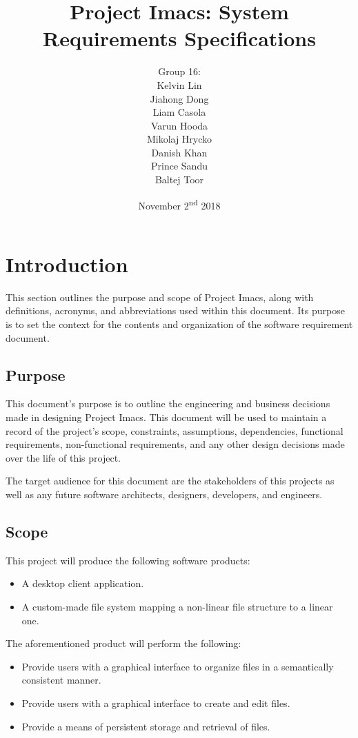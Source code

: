 \documentclass{article}
\title{Project Imacs: System Requirements Specifications}
\author{Group 16:\\ Kelvin Lin\\ Jiahong Dong\\ Liam Casola\\ Varun Hooda\\ Mikolaj Hrycko\\ Danish Khan\\ Prince Sandu\\ Baltej Toor }
\date{November 2\textsuperscript{nd} 2018}
\begin{document}
\maketitle
\newpage
\tableofcontents
\newpage
\section{Introduction}
This section outlines the purpose and scope of Project Imacs, along with definitions, acronyms, and abbreviations used within this document. Its purpose is to set the context for the contents and organization of the software requirement document.

\subsection{Purpose}
This document's purpose is to outline the engineering and business decisions made in designing Project Imacs. This document will be used to maintain a record of the project's scope, constraints, assumptions, dependencies, functional requirements, non-functional requirements, and any other design decisions made over the life of this project.

The target audience for this document are the stakeholders of this projects as well as any future software architects, designers, developers, and engineers.

\subsection{Scope}
This project will produce the following software products:

\begin{itemize}
    \item A desktop client application.
    \item A custom-made file system mapping a non-linear file structure to a linear one.
\end{itemize}

The aforementioned product will perform the following:

\begin{itemize}
    \item Provide users with a graphical interface to organize files in a semantically consistent manner.
    \item Provide users with a graphical interface to create and edit files.
    \item Provide a means of persistent storage and retrieval of files.
\end{itemize}
\end{document}
